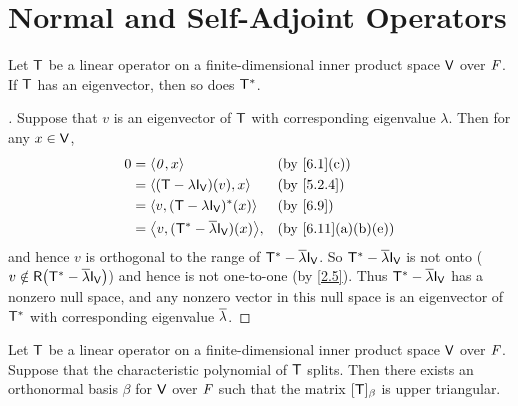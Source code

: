 \section{Normal and Self-Adjoint Operators}\label{sec:6.4}

\begin{lem}\label{6.4.1}
  Let \(\mathsf{T}\) be a linear operator on a finite-dimensional inner product space \(\mathsf{V}\) over \(\mathit{F}\).
  If \(\mathsf{T}\) has an eigenvector, then so does \(\mathsf{T}^*\).
\end{lem}

\begin{proof}[]
  Suppose that \(v\) is an eigenvector of \(\mathsf{T}\) with corresponding eigenvalue \(\lambda\).
  Then for any \(x \in \mathsf{V}\),
  \begin{align*}
    0 & = \inn{\zv, x}                                 &  & \by{6.1}[c]      \\
      & = \inn{(\T - \lambda \IT[\V])(v), x}           &  & \by{5.2.4}       \\
      & = \inn{v, (\T - \lambda \IT[\V])^*(x)}         &  & \by{6.9}         \\
      & = \inn{v, (\T^* - \conj{\lambda} \IT[\V])(x)}, &  & \by{6.11}[a,b,e]
  \end{align*}
  and hence \(v\) is orthogonal to the range of \(\T^* - \conj{\lambda} \IT[\V]\).
  So \(\T^* - \conj{\lambda} \IT[\V]\) is not onto (\(v \notin \rg{\T^* - \conj{\lambda} \IT[\V]}\)) and hence is not one-to-one (by \cref{2.5}).
  Thus \(\T^* - \conj{\lambda} \IT[\V]\) has a nonzero null space, and any nonzero vector in this null space is an eigenvector of \(\mathsf{T}^*\) with corresponding eigenvalue \(\overline{\lambda}\).
\end{proof}

\begin{thm}\label{6.14}
  Let \(\mathsf{T}\) be a linear operator on a finite-dimensional inner product space \(\mathsf{V}\) over \(\mathit{F}\).
  Suppose that the characteristic polynomial of \(\mathsf{T}\) splits.
  Then there exists an orthonormal basis \(\beta\) for \(\mathsf{V}\) over \(\mathit{F}\) such that the matrix \([\mathsf{T}]_{\beta}\) is upper triangular.
\end{thm}

